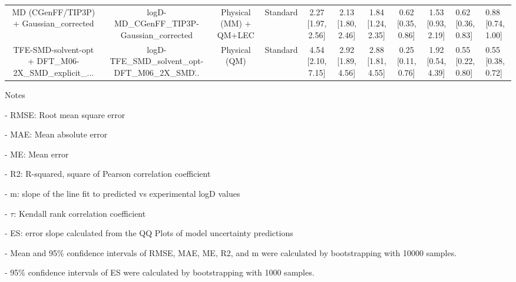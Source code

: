 \documentclass{article}
\begin{document}
\begin{center}
\begin{longtable}{|ccccccccc|}
            MD (CGenFF/TIP3P) + Gaussian_corrected &         logD-MD\_CGenFF\_TIP3P-Gaussian\_corrected &  Physical (MM) + QM+LEC &   Standard &  2.27 [1.97, 2.56] &  2.13 [1.80, 2.46] &     1.84 [1.24, 2.35] &  0.62 [0.35, 0.86] &  1.53 [0.93, 2.19] &   0.62 [0.36, 0.83] &   0.88 [0.74, 1.00] \\
 TFE-SMD-solvent-opt + DFT_M06-2X_SMD_explicit_... &  logD-TFE\_SMD\_solvent\_opt-DFT\_M06\_2X\_SMD\... &           Physical (QM) &   Standard &  4.54 [2.10, 7.15] &  2.92 [1.89, 4.56] &     2.88 [1.81, 4.55] &  0.25 [0.11, 0.76] &  1.92 [0.54, 4.39] &   0.55 [0.22, 0.80] &   0.55 [0.38, 0.72] \\
\end{longtable}
\end{center}

Notes

- RMSE: Root mean square error

- MAE: Mean absolute error

- ME: Mean error

- R2: R-squared, square of Pearson correlation coefficient

- m: slope of the line fit to predicted vs experimental logD values

- $\tau$:  Kendall rank correlation coefficient

- ES: error slope calculated from the QQ Plots of model uncertainty predictions

- Mean and 95\% confidence intervals of RMSE, MAE, ME, R2, and m were calculated by bootstrapping with 10000 samples.

- 95\% confidence intervals of ES were calculated by bootstrapping with 1000 samples.\end{document}
\end{document}
